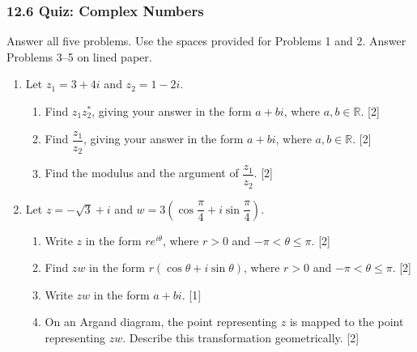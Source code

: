 \documentclass[12pt, twoside]{article}
\begin{document}
\subsubsection*{12.6 Quiz: Complex Numbers}

Answer all five problems. Use the spaces provided for Problems 1 and 2.
Answer Problems 3--5 on lined paper.

\begin{enumerate}[itemsep=0.15cm]

\item[1.] [Maximum mark: 6]

Let $z_{1} = 3 + 4i$ and $z_{2} = 1 - 2i$.

\begin{enumerate}[itemsep=0.15cm]
  \item Find $z_{1}z_{2}^{*}$, giving your answer in the form $a + bi$,
  where $a, b \in \mathbb{R}$. \hfill [2]
  \item Find $\dfrac{z_{1}}{z_{2}}$, giving your answer in the form
  $a + bi$, where $a, b \in \mathbb{R}$. \hfill [2]
  \item Find the modulus and the argument of $\dfrac{z_{1}}{z_{2}}$.
  \hfill [2]
\end{enumerate}


\newpage

\item[2.] [Maximum mark: 7]

Let $z = -\sqrt{3} + i$ and
$w = 3\left(\cos\dfrac{\pi}{4} + i\sin\dfrac{\pi}{4}\right)$.

\begin{enumerate}[itemsep=0.15cm]
  \item Write $z$ in the form $re^{i\theta}$, where $r > 0$ and
  $-\pi < \theta \leq \pi$. \hfill [2]
  \item Find $zw$ in the form $r(\cos\theta + i\sin\theta)$, where $r > 0$
  and $-\pi < \theta \leq \pi$. \hfill [2]
  \item Write $zw$ in the form $a + bi$. \hfill [1]
  \item On an Argand diagram, the point representing $z$ is mapped to the
  point representing $zw$. Describe this transformation
  geometrically. \hfill [2]
\end{enumerate}


\end{enumerate}
\end{document}
